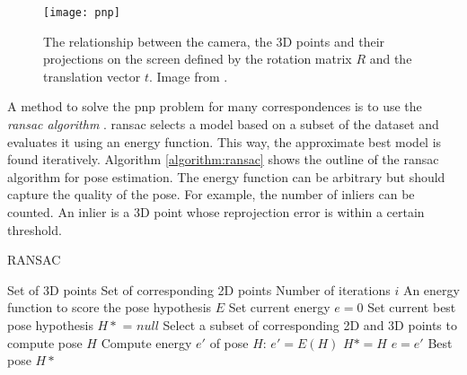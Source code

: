 \begin{figure}[!tbp]
	\centering
    \texttt{[image: pnp]}
    \caption{The relationship between the camera, the 3D points and their projections on the screen defined by the rotation matrix $R$ and the translation vector $t$. Image from \cite{opencv_pnp}.}
    	\label{fig:pnp}
\end{figure} 

A method to solve the \gls{pnp} problem for many correspondences is to use the \textit{\gls{ransac} algorithm} \cite{ransac}. \gls{ransac} selects a model based on a subset of the dataset and evaluates it using an energy function. This way, the approximate best model is found iteratively. Algorithm \ref{algorithm:ransac} shows the outline of the \gls{ransac} algorithm for pose estimation. The energy function can be arbitrary but should capture the quality of the pose. For example, the number of inliers can be counted. An inlier is a 3D point whose reprojection error is within a certain threshold.

\begin{algorithm}
\caption{RANSAC} \label{algorithm:ransac}
\begin{algorithmic} 
\REQUIRE Set of 3D points
\REQUIRE Set of corresponding 2D points
\REQUIRE Number of iterations $i$
\REQUIRE An energy function to score the pose hypothesis $E$
\STATE Set current energy $e=0$
\STATE Set current best pose hypothesis $H*$ = $null$
\STATE Select a subset of corresponding 2D and 3D points to compute pose $H$
\STATE Compute energy $e'$ of pose $H$: $e'=E(H)$
\STATE $H* = H$
\STATE $e = e'$
\ENDIF
\ENDFOR
\RETURN Best pose $H*$
\end{algorithmic}
\end{algorithm}